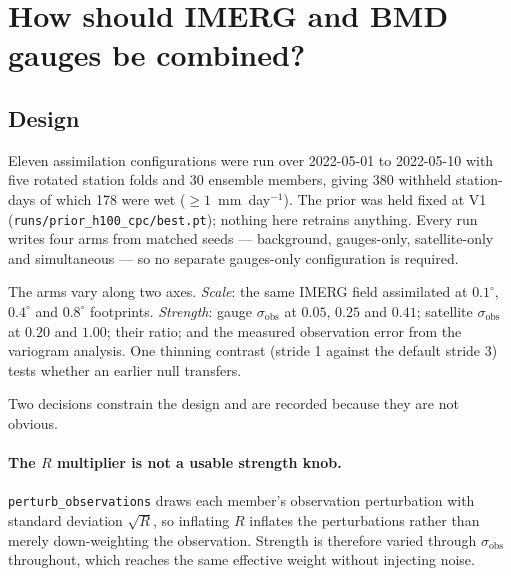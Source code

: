 %

\section{How should IMERG and BMD gauges be combined?}
\label{sec:ingestion}

\subsection{Design}

Eleven assimilation configurations were run over 2022-05-01 to 2022-05-10 with
five rotated station folds and 30 ensemble members, giving 380 withheld
station-days of which 178 were wet ($\geq 1$~mm~day$^{-1}$). The prior was held
fixed at V1 (\texttt{runs/prior\_h100\_cpc/best.pt}); nothing here retrains
anything. Every run writes four arms from matched seeds --- background,
gauges-only, satellite-only and simultaneous --- so no separate gauges-only
configuration is required.

The arms vary along two axes. \emph{Scale}: the same IMERG field assimilated at
$0.1^\circ$, $0.4^\circ$ and $0.8^\circ$ footprints. \emph{Strength}: gauge
$\sigma_{\mathrm{obs}}$ at $0.05$, $0.25$ and $0.41$; satellite
$\sigma_{\mathrm{obs}}$ at $0.20$ and $1.00$; their ratio; and the measured
observation error from the variogram analysis. One thinning contrast (stride 1
against the default stride 3) tests whether an earlier null transfers.

Two decisions constrain the design and are recorded because they are not
obvious.

\paragraph{The $R$ multiplier is not a usable strength knob.}
\texttt{perturb\_observations} draws each member's observation perturbation with
standard deviation $\sqrt{R}$, so inflating $R$ inflates the perturbations
rather than merely down-weighting the observation. Strength is therefore varied
through $\sigma_{\mathrm{obs}}$ throughout, which reaches the same effective
weight without injecting noise.


